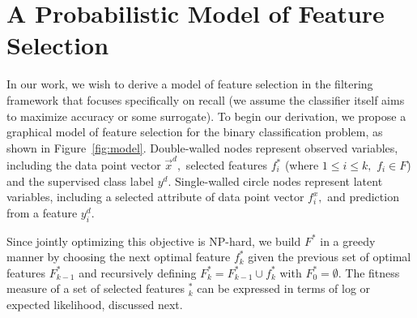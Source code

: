 \section{A Probabilistic Model of Feature Selection}

%


In our work, we wish to derive a model of feature selection in the
filtering framework that focuses specifically on recall (we assume the
classifier itself aims to maximize accuracy or some surrogate).  To
begin our derivation, we propose a graphical model of feature
selection for the binary classification problem, as shown in
Figure~\ref{fig:model}. Double-walled nodes represent observed
variables, including the data point vector $\vec{x}^{d},$ selected
features $f_i^*$ (where $1\leq i\leq k,$ $f_i\in F$) and the
supervised class label $y^d.$ Single-walled circle nodes represent
latent variables, including a selected attribute of data
point vector $f_i^x,$ and prediction from a feature $y^d_i.$

Since jointly optimizing this objective is NP-hard, we build
$F^*$ in a greedy manner by choosing the next optimal feature $f^*_k$
given the previous set of optimal features $F^*_{k-1}$ and recursively
defining $F^*_k = F^*_{k-1}\cup f^*_k$ with $F^*_0 = \emptyset$. The
fitness measure of a set of selected features $^*_k$ can be
expressed in terms of log or expected likelihood, discussed next.

